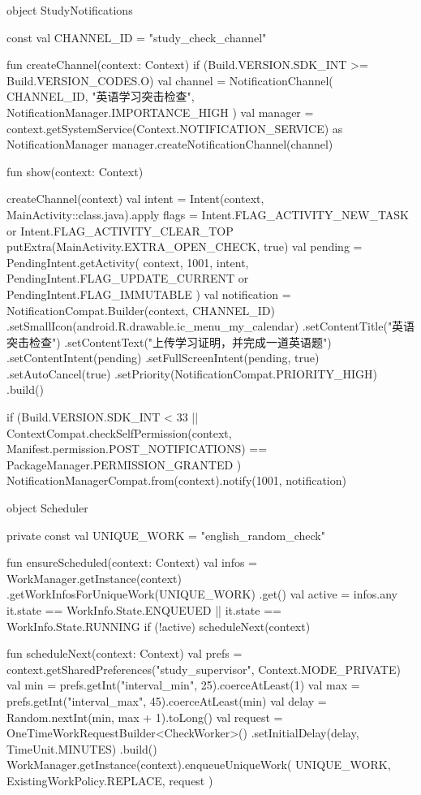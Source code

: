 object StudyNotifications {
    const val CHANNEL_ID = "study_check_channel"

    fun createChannel(context: Context) {
        if (Build.VERSION.SDK_INT >= Build.VERSION_CODES.O) {
            val channel = NotificationChannel(
                CHANNEL_ID,
                "英语学习突击检查",
                NotificationManager.IMPORTANCE_HIGH
            )
            val manager = context.getSystemService(Context.NOTIFICATION_SERVICE) as NotificationManager
            manager.createNotificationChannel(channel)
        }
    }

    fun show(context: Context) {
        createChannel(context)
        val intent = Intent(context, MainActivity::class.java).apply {
            flags = Intent.FLAG_ACTIVITY_NEW_TASK or Intent.FLAG_ACTIVITY_CLEAR_TOP
            putExtra(MainActivity.EXTRA_OPEN_CHECK, true)
        }
        val pending = PendingIntent.getActivity(
            context, 1001, intent,
            PendingIntent.FLAG_UPDATE_CURRENT or PendingIntent.FLAG_IMMUTABLE
        )
        val notification = NotificationCompat.Builder(context, CHANNEL_ID)
            .setSmallIcon(android.R.drawable.ic_menu_my_calendar)
            .setContentTitle("英语突击检查")
            .setContentText("上传学习证明，并完成一道英语题")
            .setContentIntent(pending)
            .setFullScreenIntent(pending, true)
            .setAutoCancel(true)
            .setPriority(NotificationCompat.PRIORITY_HIGH)
            .build()

        if (Build.VERSION.SDK_INT < 33 ||
            ContextCompat.checkSelfPermission(context, Manifest.permission.POST_NOTIFICATIONS) ==
            PackageManager.PERMISSION_GRANTED
        ) {
            NotificationManagerCompat.from(context).notify(1001, notification)
        }
    }
}

object Scheduler {
    private const val UNIQUE_WORK = "english_random_check"

    fun ensureScheduled(context: Context) {
        val infos = WorkManager.getInstance(context)
            .getWorkInfosForUniqueWork(UNIQUE_WORK)
            .get()
        val active = infos.any {
            it.state == WorkInfo.State.ENQUEUED || it.state == WorkInfo.State.RUNNING
        }
        if (!active) scheduleNext(context)
    }

    fun scheduleNext(context: Context) {
        val prefs = context.getSharedPreferences("study_supervisor", Context.MODE_PRIVATE)
        val min = prefs.getInt("interval_min", 25).coerceAtLeast(1)
        val max = prefs.getInt("interval_max", 45).coerceAtLeast(min)
        val delay = Random.nextInt(min, max + 1).toLong()
        val request = OneTimeWorkRequestBuilder<CheckWorker>()
            .setInitialDelay(delay, TimeUnit.MINUTES)
            .build()
        WorkManager.getInstance(context).enqueueUniqueWork(
            UNIQUE_WORK,
            ExistingWorkPolicy.REPLACE,
            request
        )
    }
}


